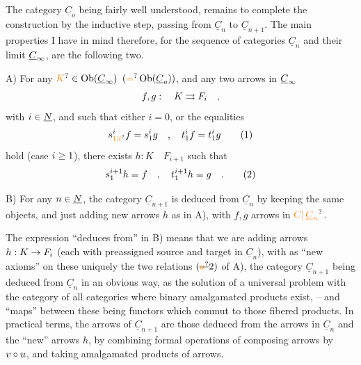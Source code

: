  The category $\underline{C}_o$ being fairly well understood, remains to complete the construction by the inductive step, passing from $\underline{C}_n$ to $\underline{C}_{n+1}$. The main properties I have in mind therefore, for the sequence of categories $\underline{C}_n$ and their limit $\underline{C}_{\infty}$, are the following two.

A) For any $\unsure{K}\handwritten{\in}\operatorname{Ob}(\underline{C}_{\handwritten{\infty}})$ $(\unsure{=}\operatorname{Ob}(\underline{C}_o))$, and any two arrows in $\underline{C}_{\infty}$
\[
 f,g: \quad K\rightrightarrows F_i\quad ,
\]
with $i\in\underline{N}$\deleted{\unsure{,}}, and such that either $i=0$, or the equalities
\[
 s_{\unsure{1|l}}^i f=s_1^i g \quad , \quad t_1^i f=t_1^i g \tag*{\handwritten{(1)}}
\]
hold (case $i\geq1$), there exists $h:K\quad F_{i+1}$ such that
\[
 s_1^{i+1}h=f\quad ,\quad t_1^{i+1}h=g\quad . \tag*{\handwritten{(2)}}
\]

B) For any $n\in\underline{N}$, the category $\underline{C}_{n+1}$ is deduced from $\underline{C}_n$ by keeping the same objects, and just adding new arrows  $h$ as in A), with $f,g$ arrows in $\unsure{C|\,\underline{C}_n}$.


The expression ``deduces from'' in B) means that we are adding arrows $h:K\to F_i$ (each with preassigned source and target in $\underline{C}_n$), with as ``new axioms'' on  these uniquely the two relations $(\deleted{\unsure{a}}2)$ of A), the category $\underline{C}_{n+1}$ being deduced from $\underline{C}_n$ in an obvious way, as the solution of a universal problem with the category of all categories where binary amalgamated products exist, -- and ``maps'' between these being functors which commut to those fibered products.
In practical terms, the arrows of $\underline{C}_{n+1}$ are those deduced from the arrows in $\underline{C}_n$ and the ``new'' arrows $h$, by combining formal operations of composing arrows by $v\circ u$, and taking  amalgamated products of arrows. 


